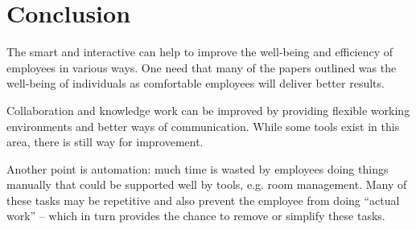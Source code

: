 \section{Conclusion}
The smart and interactive can help to improve the well-being and efficiency of employees in various ways. One need that many of the papers outlined was the well-being of individuals as comfortable employees will deliver better results.

Collaboration and knowledge work can be improved by providing flexible working environments and better ways of communication. While some tools exist in this area, there is still way for improvement. 

Another point is automation: much time is wasted by employees doing things manually that could be supported well by tools, e.g. room management. Many of these tasks may be repetitive and also prevent the employee from doing ``actual work'' -- which in turn provides the chance to remove or simplify these tasks.